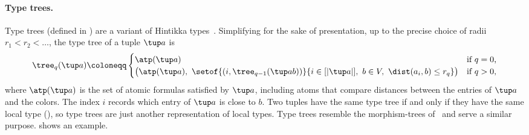 \paragraph{Type trees.}
Type trees (defined in ) are a variant of Hintikka types~\cite{Scott1979}.
Simplifying for the sake of presentation, up to the precise choice of radii $r_1<r_2<\ldots$, the type tree of a tuple $\tup a$ is
\[
\tree_q(\tup a)\coloneqq
\begin{cases}
\atp(\tup a)&\text{if $q=0$,}\\
\bigl(\atp(\tup a),\ \setof{(i,\tree_{q-1}(\tup a b))}{i\in[|\tup a|],\ b\in V,\ \dist(a_i,b)\le r_q}\bigr)&\text{if $q>0$,}
\end{cases}
\]
where $\atp(\tup a)$ is the set of atomic formulas satisfied by $\tup a$, including atoms that compare distances between the entries of $\tup a$ and the colors.
The index $i$ records which entry of $\tup a$ is close to $b$.
Two tuples have the same type tree if and only if they have the same local type (), so type trees are just another representation of local types.
Type trees resemble the morphism-trees of~\cite{tww1} and serve a similar purpose.
 shows an example.

